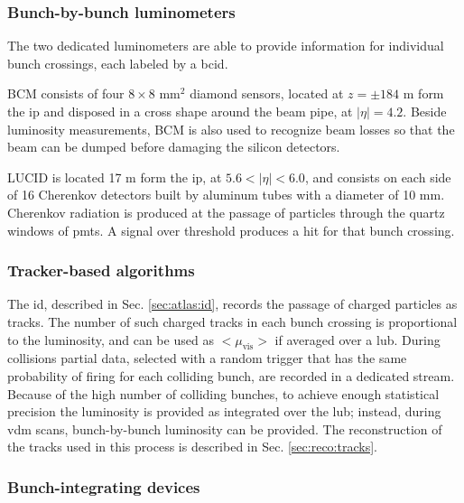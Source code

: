 \subsubsection*{Bunch-by-bunch luminometers}

The two dedicated luminometers are able to provide information for individual bunch crossings, each labeled by a \gls{bcid}.

BCM consists of four $8 \times 8$ mm$^2$ diamond sensors, located at $z= \pm 184$ m form the \gls{ip} and disposed in a cross shape around the beam pipe, at $|\eta| = 4.2$. Beside luminosity measurements, BCM is also used to recognize beam losses so that the beam can be dumped before damaging the silicon detectors. 

LUCID is located 17 m form the \gls{ip}, at $5.6 < |\eta| < 6.0$, and consists on each side of 16 Cherenkov detectors built by aluminum tubes with a diameter of 10 mm. Cherenkov radiation is produced at the passage of particles through the quartz windows of \glspl{pmt}. A signal over threshold produces a hit for that bunch crossing.


\subsubsection*{Tracker-based algorithms}

The \gls{id}, described in Sec. \ref{sec:atlas:id}, records the passage of charged particles as tracks. The number of such charged tracks in each bunch crossing is proportional to the luminosity, and can be used as $<\mu_\mathrm{vis}>$ if averaged over a \gls{lub}. 
During collisions partial data, selected with a random trigger that has the same probability of firing for each colliding bunch, are recorded in a dedicated stream. Because of the high number of colliding bunches, to achieve enough statistical precision the luminosity is provided as integrated over the \gls{lub}; instead, during \gls{vdm} scans, bunch-by-bunch luminosity can be provided. 
The reconstruction of the tracks used in this process is described in Sec. \ref{sec:reco:tracks}.

\subsubsection*{Bunch-integrating devices}

